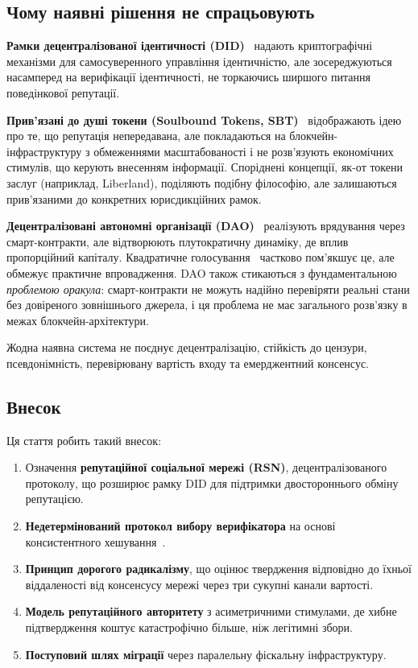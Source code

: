 \documentclass[11pt,a4paper,twocolumn]{article}
\begin{document}
\subsection{Чому наявні рішення не спрацьовують}

\textbf{Рамки децентралізованої ідентичності (DID)}~\cite{did2022} надають криптографічні механізми для самосуверенного управління ідентичністю, але зосереджуються насамперед на верифікації ідентичності, не торкаючись ширшого питання поведінкової репутації.

\textbf{Прив'язані до душі токени (Soulbound Tokens, SBT)}~\cite{weyl2022} відображають ідею про те, що репутація непередавана, але покладаються на блокчейн-інфраструктуру з обмеженнями масштабованості і не розв'язують економічних стимулів, що керують внесенням інформації. Споріднені концепції, як-от токени заслуг (наприклад, Liberland), поділяють подібну філософію, але залишаються прив'язаними до конкретних юрисдикційних рамок.

\textbf{Децентралізовані автономні організації (DAO)}~\cite{buterin2014} реалізують врядування через смарт-контракти, але відтворюють плутократичну динаміку, де вплив пропорційний капіталу. Квадратичне голосування~\cite{buterin2019} частково пом'якшує це, але обмежує практичне впровадження. DAO також стикаються з фундаментальною \emph{проблемою оракула}: смарт-контракти не можуть надійно перевіряти реальні стани без довіреного зовнішнього джерела, і ця проблема не має загального розв'язку в межах блокчейн-архітектури.

Жодна наявна система не поєднує децентралізацію, стійкість до цензури, псевдонімність, перевірювану вартість входу та емерджентний консенсус.

\subsection{Внесок}

Ця стаття робить такий внесок:
\begin{enumerate}[nosep]
\item Означення \textbf{репутаційної соціальної мережі (RSN)}, децентралізованого протоколу, що розширює рамку DID для підтримки двостороннього обміну репутацією.
\item \textbf{Недетермінований протокол вибору верифікатора} на основі консистентного хешування~\cite{karger1997}.
\item \textbf{Принцип дорогого радикалізму}, що оцінює твердження відповідно до їхньої віддаленості від консенсусу мережі через три сукупні канали вартості.
\item \textbf{Модель репутаційного авторитету} з асиметричними стимулами, де хибне підтвердження коштує катастрофічно більше, ніж легітимні збори.
\item \textbf{Поступовий шлях міграції} через паралельну фіскальну інфраструктуру.
\end{enumerate}
\end{document}
